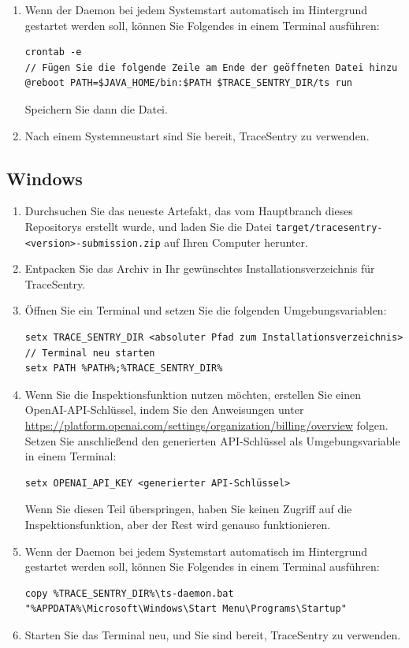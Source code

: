 \documentclass[a4paper,12pt]{report}
\begin{document}
\begin{enumerate}
        \item Wenn der Daemon bei jedem Systemstart automatisch im Hintergrund gestartet werden soll, können Sie Folgendes in einem Terminal ausführen:
        \begin{lstlisting}[label={lst:lstlisting-unix-4}]
crontab -e
// Fügen Sie die folgende Zeile am Ende der geöffneten Datei hinzu
@reboot PATH=$JAVA_HOME/bin:$PATH $TRACE_SENTRY_DIR/ts run
        \end{lstlisting}
        Speichern Sie dann die Datei.
        \item Nach einem Systemneustart sind Sie bereit, TraceSentry zu verwenden.
    \end{enumerate}

    \subsection{Windows}
    \begin{enumerate}
        \item Durchsuchen Sie das neueste Artefakt, das vom Hauptbranch dieses Repositorys erstellt wurde, und laden Sie die Datei
        \texttt{target/tracesentry-\textless{}version\textgreater{}-submission.zip} auf Ihren Computer herunter.
        \item Entpacken Sie das Archiv in Ihr gewünschtes Installationsverzeichnis für TraceSentry.
        \item Öffnen Sie ein Terminal und setzen Sie die folgenden Umgebungsvariablen:
        \begin{lstlisting}[label={lst:lstlisting-windows-1}]
setx TRACE_SENTRY_DIR <absoluter Pfad zum Installationsverzeichnis>
// Terminal neu starten
setx PATH %PATH%;%TRACE_SENTRY_DIR%
        \end{lstlisting}
        \item Wenn Sie die Inspektionsfunktion nutzen möchten, erstellen Sie einen OpenAI-API-Schlüssel, indem Sie den Anweisungen unter \url{https://platform.openai.com/settings/organization/billing/overview} folgen.
        Setzen Sie anschließend den generierten API-Schlüssel als Umgebungsvariable in einem Terminal:
        \begin{lstlisting}[label={lst:lstlisting-windows-2}]
setx OPENAI_API_KEY <generierter API-Schlüssel>
        \end{lstlisting}
        Wenn Sie diesen Teil überspringen, haben Sie keinen Zugriff auf die Inspektionsfunktion, aber der Rest wird genauso funktionieren.
        \item Wenn der Daemon bei jedem Systemstart automatisch im Hintergrund gestartet werden soll, können Sie Folgendes in einem Terminal ausführen:
        \begin{lstlisting}[label={lst:lstlisting-windows-3}]
copy %TRACE_SENTRY_DIR%\ts-daemon.bat "%APPDATA%\Microsoft\Windows\Start Menu\Programs\Startup"
        \end{lstlisting}
        \item Starten Sie das Terminal neu, und Sie sind bereit, TraceSentry zu verwenden.
    \end{enumerate}
\end{document}
